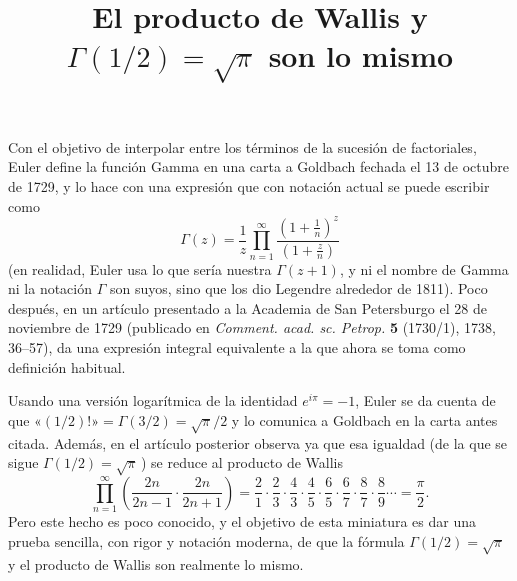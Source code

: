 \documentclass[autocontact]{gaceta}
\title{El producto de Wallis y $\Gamma(1/2) = \sqrt{\pi}$ son lo mismo}
\begin{document}

\previousvspace{-1.8cm}
\makesupertitle
\previousvspace{-0.25cm}
\maketitle
\vspace*{-0.4cm}
\thispagestyle{empty} %

Con el objetivo de interpolar entre los términos de la sucesión de factoriales, Euler define la función Gamma en una carta a Goldbach fechada el 13 de octubre de 1729, y lo hace con una expresión que con notación actual se puede escribir como
\begin{equation}
\label{eq:Gz}
  \Gamma(z) = \frac{1}{z} \prod_{n=1}^{\infty} \frac{\left(1+\frac{1}{n}\right)^z}{\left(1+\frac{z}{n}\right)}
\end{equation}
(en realidad, Euler usa lo que sería nuestra $\Gamma(z+1)$, y ni el nombre de Gamma ni la notación $\Gamma$ son suyos, sino que los dio Legendre alrededor de 1811). 
Poco después, en un artículo presentado a la Academia de San Petersburgo el 28 de noviembre de 1729 (publicado en \textit{Comment. acad. sc. Petrop.} \textbf{5} (1730/1), 1738, 36--57), da una expresión integral equivalente a la que ahora se toma como definición habitual.

Usando una versión logarítmica de la identidad $e^{i \pi} = -1$, Euler se da cuenta de que $\text{«}(1/2)!\text{»} = \Gamma(3/2) = \sqrt{\pi}/2$ y lo comunica a Goldbach en la carta antes citada. Además, en el artículo posterior observa ya que esa igualdad (de la que se sigue $\Gamma(1/2) = \sqrt{\pi}$\,) se reduce al producto de Wallis
\[
 \prod_{n=1}^{\infty} \left(\frac{2n}{2n-1} \cdot \frac{2n}{2n+1} \right) =
 \frac{2}{1} \cdot \frac{2}{3} \cdot \frac{4}{3} \cdot \frac{4}{5} \cdot \frac{6}{5}
 \cdot \frac{6}{7} \cdot \frac{8}{7} \cdot \frac{8}{9}  \cdots = \frac{\pi}{2}.
\]
Pero este hecho es poco conocido, y el objetivo de esta miniatura es dar una prueba sencilla, con rigor y notación moderna, de que la fórmula $\Gamma(1/2) = \sqrt{\pi}$ y el producto de Wallis son realmente lo mismo.
\end{document}
